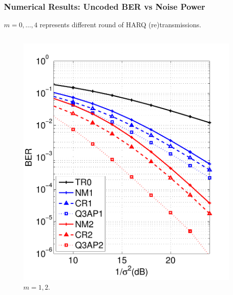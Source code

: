 \documentclass{beamer}
\begin{document}
\begin{frame}
  \frametitle{Numerical Results: Uncoded BER vs Noise Power}
  $m=0,\ldots,4$ represents different round of HARQ (re)transmissions.
  \begin{columns}
    \begin{figure}
      \includegraphics[width=1.0\textwidth]{figs/BER_noise_power_MonteCarlo_64QAM_23_Q3AP.pdf}
      \caption{$m=1,2$.}
    \end{figure}
    

\end{columns}
\end{frame}
\end{document}
